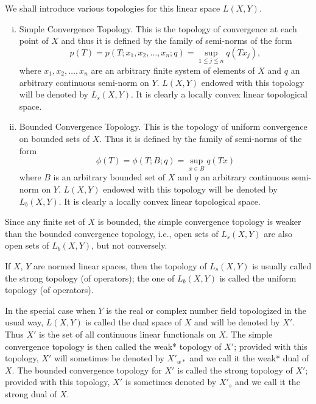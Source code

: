 We shall introduce various topologies for this linear space $L(X, Y)$. 

\begin{enumerate}[i)]
\item Simple Convergence Topology. This is the topology of convergence at each point of $X$ and thus it is defined by the family of semi-norms of the form 
\[
p (T) = p (T; x _{1}, x _{2}, \dots , x _{n}; q) = \sup\limits _{1 \leqq j \leqq n} q (T x _{j}),
\]
where $x_{1}, x_{2}, \ldots, x_{n}$ are an arbitrary finite system of elements of $X$ and $q$ an arbitrary continuous semi-norm on $Y$. $L(X, Y)$ endowed with this topology will be denoted by $L_{s}(X, Y)$. It is clearly a locally convex linear topological space.
\item Bounded Convergence Topology. This is the topology of uniform convergence on bounded sets of $X$. Thus it is defined by the family of 
semi-norms of the form 
\[
\phi (T) = \phi (T; B; q) = \sup\limits _{x \in B} q (T x)
\]
where $B$ is an arbitrary bounded set of $X$ and $q$ an arbitrary continuous semi-norm on $Y$. $L(X, Y)$ endowed with this topology will be denoted by $L_{b}(X, Y)$. It is clearly a locally convex linear topological space.
\end{enumerate}
Since any finite set of $X$ is bounded, the simple convergence topology is weaker than the bounded convergence topology, i.e., open sets of $L_{s}(X, Y)$ are also open sets of $L_{b}(X, Y)$, but not conversely. 

\begin{definition}\label{def:IV.7.Definition.1} If $X$, $Y$ are normed linear spaces, then the topology of $L_{s}(X, Y)$ is usually called the strong topology (of operators); the one of $L_{b}(X, Y)$ is called the uniform topology (of operators). 
\end{definition}


\begin{definitionn}\label{def:IV.7.Definition.1prime} In the special case when $Y$ is the real or complex number field topologized in the usual way, $L(X, Y)$ is called the dual space of $X$ and will be denoted by $X'$. Thus $X'$ is the set of all continuous linear functionals on $X$. The simple convergence topology is then called the weak* topology of $X'$; provided with this topology, $X'$ will sometimes be denoted by $X'_{w*}$ and we call it the weak* dual of $X$. The bounded convergence topology for $X'$ is called the strong topology of $X'$; provided with this topology, $X'$ is sometimes denoted by $X'_{s}$ and we call it the strong dual of $X$.
\end{definitionn}

